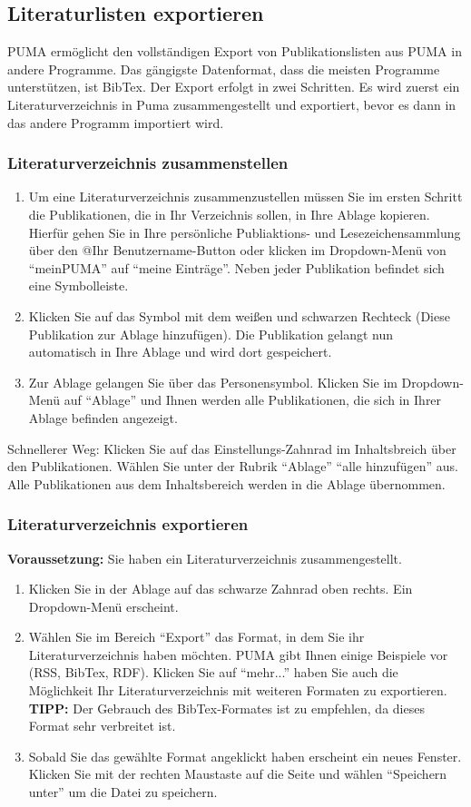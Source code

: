 \subsection{Literaturlisten exportieren}
PUMA ermöglicht den vollständigen Export von Publikationslisten aus PUMA in andere Programme. Das gängigste Datenformat, dass die meisten Programme unterstützen, ist BibTex. \newline 
Der Export erfolgt in zwei Schritten. Es wird zuerst ein Literaturverzeichnis in Puma zusammengestellt und exportiert, bevor es dann in das andere Programm importiert wird.
\subsubsection{Literaturverzeichnis zusammenstellen}
\begin{enumerate}
    \item Um eine Literaturverzeichnis zusammenzustellen müssen Sie im ersten Schritt die Publikationen, die in Ihr Verzeichnis sollen, in Ihre Ablage kopieren. Hierfür gehen Sie in Ihre persönliche Publiaktions- und Lesezeichensammlung über den @Ihr Benutzername-Button oder klicken im Dropdown-Menü von \enquote{meinPUMA} auf \enquote{meine Einträge}.  Neben jeder Publikation befindet sich eine Symbolleiste.
    \item Klicken Sie auf das Symbol mit dem weißen und schwarzen Rechteck (Diese Publikation zur Ablage hinzufügen). Die Publikation gelangt nun automatisch in Ihre Ablage und wird dort gespeichert.
    \item Zur Ablage gelangen Sie über das Personensymbol. Klicken Sie im Dropdown-Menü auf \enquote{Ablage} und Ihnen werden alle Publikationen, die sich in Ihrer Ablage befinden angezeigt. 
\end{enumerate}
Schnellerer Weg: Klicken Sie auf das Einstellungs-Zahnrad im Inhaltsbreich über den Publikationen. Wählen Sie unter der Rubrik \enquote{Ablage} \enquote{alle hinzufügen} aus. Alle Publikationen aus dem Inhaltsbereich werden in die Ablage übernommen. 
\subsubsection{Literaturverzeichnis exportieren}
\textbf{Voraussetzung:} Sie haben ein Literaturverzeichnis zusammengestellt.
\begin{enumerate}
    \item Klicken Sie in der Ablage auf das schwarze Zahnrad oben rechts. Ein Dropdown-Menü erscheint.
    \item Wählen Sie im Bereich \enquote{Export} das Format, in dem Sie ihr Literaturverzeichnis haben möchten. PUMA gibt Ihnen einige Beispiele vor (RSS, BibTex, RDF). Klicken Sie auf \enquote{mehr...} haben Sie auch die Möglichkeit Ihr Literaturverzeichnis mit weiteren Formaten zu exportieren. \textbf{TIPP:} Der Gebrauch des BibTex-Formates ist zu empfehlen, da dieses Format sehr verbreitet ist.
    \item Sobald Sie das gewählte Format angeklickt haben erscheint ein neues Fenster. Klicken Sie mit der rechten Maustaste auf die Seite und wählen \enquote{Speichern unter} um die Datei zu speichern.
\end{enumerate}
